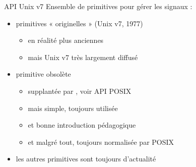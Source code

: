 \begin {frame} {API Unix v7}
    Ensemble de primitives pour gérer les signaux :

    \vspace* {-3mm}


    \vspace* {-2mm}

    \begin {itemize}
	\item primitives « originelles » (Unix v7, 1977)
	    \begin {itemize}
		\item en réalité plus anciennes
		\item mais Unix v7 très largement diffusé

	    \end {itemize}
	\item primitive  obsolète
	    \begin {itemize}
		\item supplantée par , voir API POSIX
		\item mais  simple, toujours utilisée
		\item et bonne introduction pédagogique
		\item et malgré tout, toujours normalisée par POSIX
	    \end {itemize}
	\item les autres primitives sont toujours d'actualité
    \end {itemize}
\end {frame}

